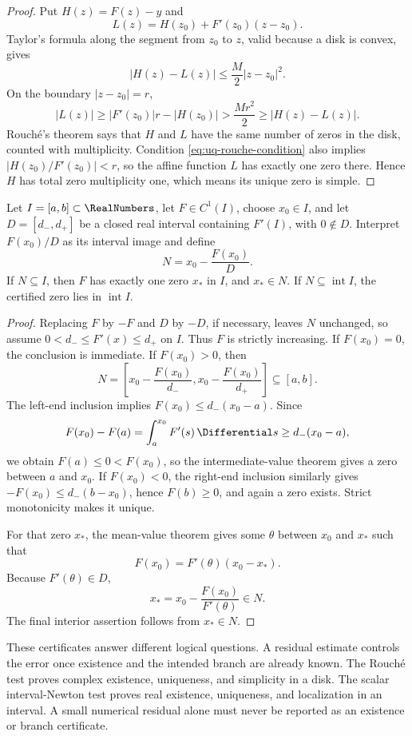 \begin{proof}
Put \(H(z)=F(z)-y\) and
\[
 L(z)=H(z_0)+F'(z_0)(z-z_0).
\]
Taylor's formula along the segment from \(z_0\) to \(z\), valid because a
disk is convex, gives
\[
 \lvert H(z)-L(z)\rvert\le\frac{M}{2}\lvert z-z_0\rvert^2.
\]
On the boundary \(\lvert z-z_0\rvert=r\),
\[
 \lvert L(z)\rvert
 \ge\lvert F'(z_0)\rvert r-\lvert H(z_0)\rvert
 >\frac{Mr^2}{2}
 \ge\lvert H(z)-L(z)\rvert.
\]
Rouch\'e's theorem says that \(H\) and \(L\) have the same number of zeros
in the disk, counted with multiplicity.  Condition
\eqref{eq:uq-rouche-condition} also implies
\(\lvert H(z_0)/F'(z_0)\rvert<r\), so the affine function \(L\) has exactly
one zero there.  Hence \(H\) has total zero multiplicity one, which means
its unique zero is simple.
\end{proof}

\begin{theorem}
\label{thm:uq-interval-newton-certificate}
Let \(I=[a,b]\subset\RealNumbers\), let \(F\in C^1(I)\), choose \(x_0\in I\), and let
\(D=[d_-,d_+]\) be a closed real interval containing \(F'(I)\), with
\(0\notin D\).  Interpret \(F(x_0)/D\) as its interval image and define
\[
 N=x_0-\frac{F(x_0)}{D}.
\]
If \(N\subseteq I\), then \(F\) has exactly one zero \(x_*\) in \(I\), and
\(x_*\in N\).  If \(N\subseteq\operatorname{int}I\), the certified zero lies
in \(\operatorname{int}I\).
\end{theorem}

\begin{proof}
Replacing \(F\) by \(-F\) and \(D\) by \(-D\), if necessary, leaves \(N\)
unchanged, so assume
\(0<d_-\le F'(x)\le d_+\) on \(I\).  Thus \(F\) is strictly increasing.
If \(F(x_0)=0\), the conclusion is immediate.  If \(F(x_0)>0\), then
\[
 N=\left[
 x_0-\frac{F(x_0)}{d_-},
 x_0-\frac{F(x_0)}{d_+}
 \right]\subseteq[a,b].
\]
The left-end inclusion implies
\(F(x_0)\le d_-(x_0-a)\).  Since
\[
 F(x_0)-F(a)=\int_a^{x_0}F'(s)\,\Differential s
 \ge d_-(x_0-a),
\]
we obtain \(F(a)\le0<F(x_0)\), so the intermediate-value theorem gives a
zero between \(a\) and \(x_0\).  If \(F(x_0)<0\), the right-end inclusion
similarly gives
\(-F(x_0)\le d_-(b-x_0)\), hence \(F(b)\ge0\), and again a zero exists.
Strict monotonicity makes it unique.

For that zero \(x_*\), the mean-value theorem gives some \(\theta\) between
\(x_0\) and \(x_*\) such that
\[
 F(x_0)=F'(\theta)(x_0-x_*).
\]
Because \(F'(\theta)\in D\),
\[
 x_*=x_0-\frac{F(x_0)}{F'(\theta)}\in N.
\]
The final interior assertion follows from \(x_*\in N\).
\end{proof}

\begin{boxedremark}
These certificates answer different logical questions.  A residual estimate
controls the error once existence and the intended branch are already known.
The Rouch\'e test proves complex existence, uniqueness, and simplicity in a
disk.  The scalar interval-Newton test proves real existence, uniqueness, and
localization in an interval.  A small numerical residual alone must never be
reported as an existence or branch certificate.
\end{boxedremark}
